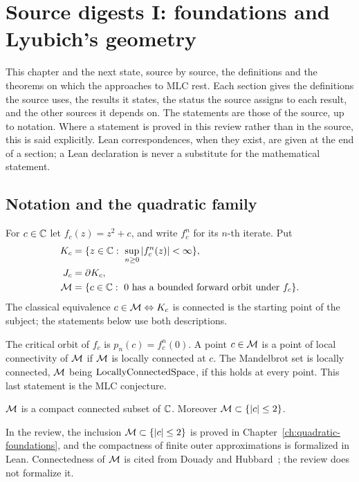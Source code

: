 \chapter{Source digests I: foundations and Lyubich's geometry}
\label{ch:digests-foundations}

This chapter and the next state, source by source, the definitions and the
theorems on which the approaches to MLC rest.  Each section gives the
definitions the source uses, the results it states, the status the source
assigns to each result, and the other sources it depends on.  The statements
are those of the source, up to notation.  Where a statement is proved in this
review rather than in the source, this is said explicitly.  Lean
correspondences, when they exist, are given at the end of a section; a Lean
declaration is never a substitute for the mathematical statement.

\section{Notation and the quadratic family}

For $c\in\mathbb C$ let $f_c(z)=z^2+c$, and write $f_c^{n}$ for its $n$-th iterate.
Put
\begin{align*}
 K_c&=\{z\in\mathbb C:\ \sup_{n\ge0}|f_c^n(z)|<\infty\},\\
 J_c&=\partial K_c,\\
 \mathcal M&=\{c\in\mathbb C:\ 0\text{ has a bounded forward orbit under }f_c\}.
\end{align*}
The classical equivalence $c\in\mathcal M\Leftrightarrow K_c$ is connected is the
starting point of the subject; the statements below use both descriptions.

\begin{definition}
\label{def:mlc-statement}
The critical orbit of $f_c$ is $p_n(c)=f_c^n(0)$.  A point $c\in\mathcal M$ is a point of
local connectivity of $\mathcal M$ if $\mathcal M$ is locally connected at $c$.  The Mandelbrot
set is locally connected, $\mathcal M$ being $\operatorname{LocallyConnectedSpace}$, if this holds at
every point.  This last statement is the MLC conjecture.
\end{definition}

\begin{theorem}
\label{thm:dh-compact-connected}
$\mathcal M$ is a compact connected subset of $\mathbb C$.  Moreover $\mathcal M\subset\{|c|\le2\}$.
\end{theorem}

\begin{remark}
In the review, the inclusion $\mathcal M\subset\{|c|\le2\}$ is proved in
Chapter~\ref{ch:quadratic-foundations}, and the compactness of finite outer
approximations is formalized in Lean.  Connectedness of $\mathcal M$ is cited from
Douady and Hubbard~\cite{DH}; the review does not formalize it.
\end{remark}

